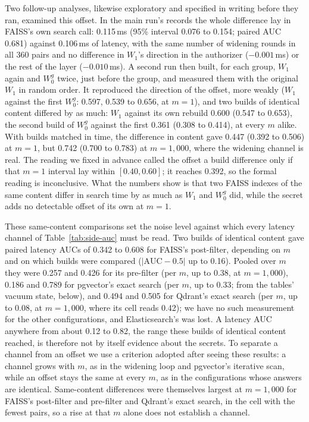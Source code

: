 Two follow-up analyses, likewise exploratory and specified in writing before they ran, examined this
offset. In the
main run's records the whole difference lay in FAISS's own search call: 0.115\,ms (95\% interval
0.076 to 0.154; paired AUC 0.681) against 0.106\,ms of latency, with the same number of widening
rounds in all 360 pairs and no difference in $W_1$'s direction in the authorizer ($-0.001$\,ms) or
the rest of the layer ($-0.010$\,ms). A second run then built, for each group, $W_1$ again and
$W_0^g$ twice, just before the group, and measured them with the original $W_1$ in random order. It
reproduced the direction of the offset, more weakly ($W_1$ against the first $W_0^g$: 0.597, 0.539
to 0.656, at $m = 1$), and two builds of identical content differed by as much: $W_1$ against its
own rebuild 0.600 (0.547 to 0.653), the second build of $W_0^g$ against the first 0.361 (0.308 to
0.414), at every $m$ alike. With builds matched in time, the difference in content gave 0.447 (0.392
to 0.506) at $m = 1$, but 0.742 (0.700 to 0.783) at $m = 1{,}000$, where the widening channel is real.
The reading we fixed in advance called the offset a build difference only if that $m = 1$ interval
lay within $[0.40, 0.60]$; it reaches 0.392, so the formal reading is inconclusive. What the numbers
show is that two FAISS indexes of the same content differ in search time by as much as $W_1$ and
$W_0^g$ did, while the secret adds no detectable offset of its own at $m = 1$.

These same-content comparisons set the noise level against which every latency channel of
Table~\ref{tab:side-auc} must be read. Two builds of identical content gave paired latency AUCs of
0.342 to 0.608 for FAISS's post-filter, depending on $m$ and on which builds were compared
($|\mathrm{AUC} - 0.5|$ up to 0.16). Pooled over $m$ they were 0.257 and 0.426 for its
pre-filter (per $m$, up to 0.38, at $m = 1{,}000$), 0.186 and 0.789 for pgvector's exact search (per $m$, up to 0.33; from the tables'
vacuum state, below), and 0.494 and 0.505 for Qdrant's exact search (per $m$, up to 0.08, at $m = 1{,}000$, where its cell reads 0.42); we have no such
measurement for the other configurations, and Elasticsearch's was lost. A latency AUC anywhere from about
0.12 to 0.82, the range these builds of identical content reached, is therefore not by itself evidence about the secrets. To separate a channel from an
offset we use a criterion adopted after seeing these results: a channel grows with $m$, as in the widening loop and pgvector's iterative scan, while
an offset stays the same at every $m$, as in the configurations whose answers are identical. Same-content differences were themselves largest at $m = 1{,}000$ for FAISS's post-filter and pre-filter and Qdrant's exact search, in the cell with the fewest pairs, so a rise at that $m$ alone does not establish a channel.

